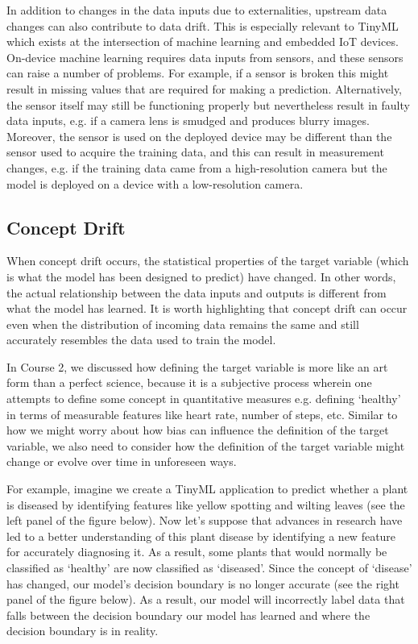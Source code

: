     In addition to changes in the data inputs due to externalities, upstream data changes can also contribute to data drift. This is especially relevant to TinyML which exists at the intersection of machine learning and embedded IoT devices. On-device machine learning requires data inputs from sensors, and these sensors can raise a number of problems. For example, if a sensor is broken this might result in missing values that are required for making a prediction. Alternatively, the sensor itself may still be functioning properly but nevertheless result in faulty data inputs, e.g. if a camera lens is smudged and produces blurry images. Moreover, the sensor is used on the deployed device may be different than the sensor used to acquire the training data, and this can result in measurement changes, e.g. if the training data came from a high-resolution camera but the model is deployed on a device with a low-resolution camera.
    
\subsection{Concept Drift}

    When concept drift occurs, the statistical properties of the target variable (which is what the model has been designed to predict) have changed. In other words, the actual relationship between the data inputs and outputs is different from what the model has learned. It is worth highlighting that concept drift can occur even when the distribution of incoming data remains the same and still accurately resembles the data used to train the model.
    
    In Course 2, we discussed how defining the target variable is more like an art form than a perfect science, because it is a subjective process wherein one attempts to define some concept in quantitative measures e.g. defining ‘healthy’ in terms of measurable features like heart rate, number of steps, etc. Similar to how we might worry about how bias can influence the definition of the target variable, we also need to consider how the definition of the target variable might change or evolve over time in unforeseen ways.
    
    For example, imagine we create a TinyML application to predict whether a plant is diseased by identifying features like yellow spotting and wilting leaves (see the left panel of the figure below). Now let’s suppose that advances in research have led to a better understanding of this plant disease by identifying a new feature for accurately diagnosing it. As a result, some plants that would normally be classified as ‘healthy’ are now classified as ‘diseased’. Since the concept of ‘disease’ has changed, our model’s decision boundary is no longer accurate (see the right panel of the figure below). As a result, our model will incorrectly label data that falls between the decision boundary our model has learned and where the decision boundary is in reality.
    
